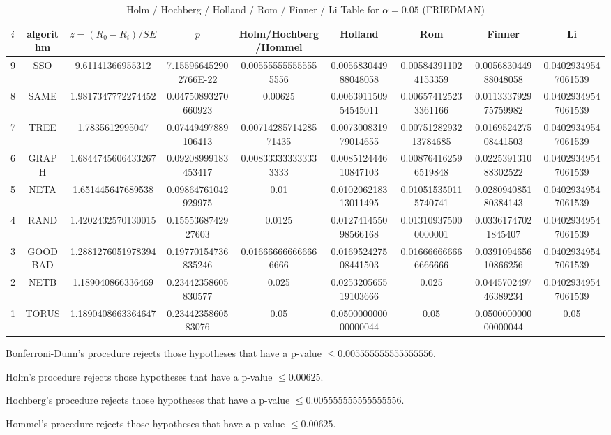 \documentclass[a4paper,10pt]{article}
\begin{document}
\begin{landscape}
\begin{table}[!htp]
\centering\scriptsize
\caption{Holm / Hochberg / Holland / Rom / Finner / Li Table for $\alpha=0.05$ (FRIEDMAN)}
\begin{tabular}{ccccccccc}
$i$&algorithm&$z=(R_0 - R_i)/SE$&$p$&Holm/Hochberg/Hommel&Holland&Rom&Finner&Li\\
\hline
9& SSO&9.61141366955312&7.155966452902766E-22&0.005555555555555556&0.005683044988048058&0.005843911024153359&0.005683044988048058&0.04029349547061539\\
8& SAME&1.9817347772274452&0.04750893270660923&0.00625&0.006391150954545011&0.006574125233361166&0.011333792975759982&0.04029349547061539\\
7& TREE&1.7835612995047&0.07449497889106413&0.0071428571428571435&0.007300831979014655&0.0075128293213784685&0.016952427508441503&0.04029349547061539\\
6& GRAPH&1.6844745606433267&0.09208999183453417&0.008333333333333333&0.008512444610847103&0.008764162596519848&0.022539131088302522&0.04029349547061539\\
5& NETA&1.651445647689538&0.09864761042929975&0.01&0.010206218313011495&0.010515350115740741&0.028094085180384143&0.04029349547061539\\
4& RAND&1.4202432570130015&0.1555368742927603&0.0125&0.012741455098566168&0.013109375000000001&0.03361747021845407&0.04029349547061539\\
3& GOODBAD&1.2881276051978394&0.19770154736835246&0.016666666666666666&0.016952427508441503&0.016666666666666666&0.039109465610866256&0.04029349547061539\\
2& NETB&1.189040866336469&0.23442358605830577&0.025&0.025320565519103666&0.025&0.044570249746389234&0.04029349547061539\\
1& TORUS&1.1890408663364647&0.2344235860583076&0.05&0.050000000000000044&0.05&0.050000000000000044&0.05\\
\hline
\end{tabular}
\end{table}
Bonferroni-Dunn's procedure rejects those hypotheses that have a p-value $\le0.005555555555555556$.


Holm's procedure rejects those hypotheses that have a p-value $\le0.00625$.


Hochberg's procedure rejects those hypotheses that have a p-value $\le0.005555555555555556$.


Hommel's procedure rejects those hypotheses that have a p-value $\le0.00625$.



\end{landscape}
\end{document}
